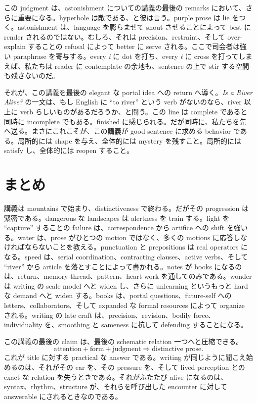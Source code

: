 この judgment は、astonishment についての講義の最後の remarks において、さらに重要になる。hyperbole は敵である、と彼は言う。purple prose は lie をつく。astonishment は、language を膨らませて shout させることによって best に render されるのではない。むしろ、それは precision、restraint、そして over-explain することの refusal によって better に serve される。ここで司会者は強い paraphrase を寄与する。every \emph{i} に dot を打ち、every \emph{t} に cross を打ってしまえば、私たちは reader に contemplate の余地も、sentence の上で stir する空間も残さないのだ。

それが、この講義を最後の elegant な portal idea への return へ導く。\emph{Is a River Alive?} の一文は、もし English に ``to river'' という verb がないのなら、river 以上に verb らしいものがあるだろうか、と問う。この line は complete であると同時に incomplete でもある。finished に感じられる。だが同時に、私たちを先へ送る。まさにこれこそが、この講義が good sentence に求める behavior である。局所的には shape を与え、全体的には mystery を残すこと。局所的には satisfy し、全体的には reopen すること。

\section{まとめ}

講義は mountains で始まり、distinctiveness で終わる。だがその progression は緊密である。dangerous な landscapes は alertness を train する。light を ``capture'' することの failure は、correspondence から artifice への shift を強いる。water は、prose がひとつの motion ではなく、多くの motions に応答しなければならないことを教える。punctuation と prepositions は real operators になる。speed は、serial coordination、contracting clauses、active verbs、そして ``river'' から article を落とすことによって書かれる。notes が books になるのは、return、memory-thread、pattern、heart work を通してのみである。wonder は writing の scale model へと widen し、さらに unlearning というもっと hard な demand へと widen する。books は、portal questions、future-self への letters、collaborators、そして expanded な formal resources によって organize される。writing の late craft は、precision、revision、bodily force、individuality を、smoothing と sameness に抗して defending することになる。

この講義の最後の claim は、最後の schematic relation 一つへと圧縮できる。
\begin{equation}
\text{attention} + \text{form} + \text{judgment} \Longrightarrow \text{distinctive prose}.
\end{equation}
これが title に対する practical な answer である。writing が同じように聞こえ始めるのは、それがその ear を、その pressure を、そして lived perception との exact な relation を失うときである。それがふたたび alive になるのは、syntax、rhythm、structure が、それらを呼び出した encounter に対して answerable にされるときなのである。